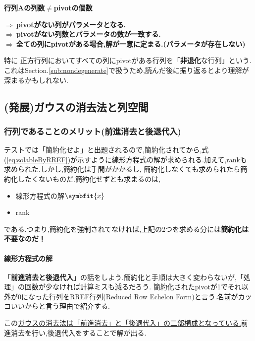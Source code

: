 \begin{tcolorbox}[colframe=black!80,colback=white,title= パラメータの存在条件]
\begin{center}
   \textbf{行列Aの列数$\neq$pivotの個数}
\end{center}
    \hspace{1cm}$\Longrightarrow\:$\textbf{pivotがない列がパラメータとなる.}\\
    \hspace{1cm}$\Longrightarrow\:$\textbf{pivotがない列数とパラメータの数が一致する.}\\
    \hspace{1cm}$\Longrightarrow\:$\textbf{全ての列にpivotがある場合,解が一意に定まる.(パラメータが存在しない)}
\end{tcolorbox}
特に
正方行列においてすべての列にpivotがある行列を「\textbf{非退化}な行列」という.これはSection.\ref{sub:nondegenerate}で扱うため,読んだ後に振り返るとより理解が深まるかもしれない.
\subsection{(発展)ガウスの消去法と列空間}\label{subsec:Gaussian}
\subsubsection{行列であることのメリット(前進消去と後退代入)}\label{subsub:Gaussian}
テストでは「簡約化せよ」と出題されるので,簡約化されてから,式(\ref{eq:solableByRREF})が示すように線形方程式の解が求められる.加えて,rankも求められた.しかし,簡約化は手間がかかるし,
簡約化しなくても求められたら簡約化したくないものだ.簡約化せずとも求まるのは,
\begin{itemize}
    \item 線形方程式の解$\symbfit{x}$
    \item rank
\end{itemize}
である.つまり,簡約化を強制されてなければ,上記の2つを求める分には\textbf{簡約化は不要なのだ！}
\paragraph{線形方程式の解}
「\textbf{前進消去と後退代入}」の話をしよう.簡約化と手順は大きく変わらないが,「処理」の回数が少なければ計算ミスも減るだろう.
簡約化されたpivotが1でそれ以外が0になった行列をRREF行列(Reduced Row Echelon Form)と言う.名前がカッコいいからと言う理由で紹介する.

この\underline{ガウスの消去法は「前進消去」と「後退代入」の二部構成となっている.}前進消去を行い,後退代入をすることで解が出る.

